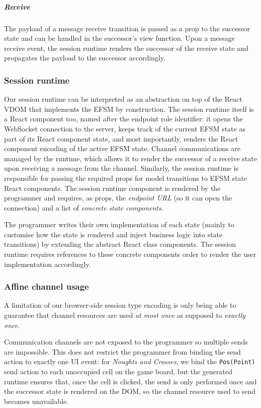 \documentclass[submission,copyright,creativecommons]{eptcs}
\begin{document}
\subparagraph{Receive} The payload of a message receive transition is passed as a prop to the successor state and can be handled in the successor's view function. Upon a message receive event, the session runtime renders the successor of the receive state and propagates the payload to the successor accordingly.

\subsubsection{Session runtime}
\label{section:clientruntime}

Our session runtime can be interpreted as an abstraction on top of the React VDOM that implements the EFSM by construction. The session runtime itself is a React component too, named after the endpoint role identifier: it opens the WebSocket connection to the server, keeps track of the current EFSM state as part of its React component state, and most importantly, renders the React component encoding of the active EFSM state. Channel communications are managed by the runtime, which allows it to render the successor of a receive state upon receiving a message from the channel. Similarly, the session runtime is responsible for passing the required props for model transitions to EFSM state React components. The session runtime component is rendered by the programmer and requires, as props, the \textit{endpoint URL} (so it can open the connection) and a list of \textit{concrete state components}.

The programmer writes their own implementation of each state (mainly to customise how the state is rendered and inject business logic into state transitions) by extending the abstract React class components. The session runtime requires references to these concrete components order to render the user implementation accordingly.

\subsubsection{Affine channel usage}
A limitation of our browser-side session type encoding is only being able to guarantee that channel resources are used \textit{at most once} as supposed to \textit{exactly once}.

Communication channels are not exposed to the programmer so multiple sends are impossible. This does not restrict the programmer from binding the send action to exactly one UI event: for \textit{Noughts and Crosses}, we bind the \texttt{Pos(Point)} send action to each unoccupied cell on the game board, but the generated runtime ensures that, once the cell is clicked, the send is only performed once and the successor state is rendered on the DOM, so the channel resource used to send becomes unavailable.
\end{document}
